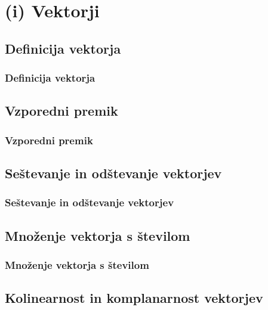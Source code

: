 \section{(i) Vektorji}

\begin{frame}
    \sectionpage
\end{frame}

\begin{frame}
\end{frame}

    \subsection{Definicija vektorja}

        \begin{frame}
            \frametitle{Definicija vektorja}
        \end{frame}

    \subsection{Vzporedni premik}

        \begin{frame}
            \frametitle{Vzporedni premik}
        \end{frame}

    \subsection{Seštevanje in odštevanje vektorjev}

        \begin{frame}
            \frametitle{Seštevanje in odštevanje vektorjev}
        \end{frame}

    \subsection{Množenje vektorja s številom}

        \begin{frame}
            \frametitle{Množenje vektorja s številom}
        \end{frame}

    \subsection{Kolinearnost in komplanarnost vektorjev}

